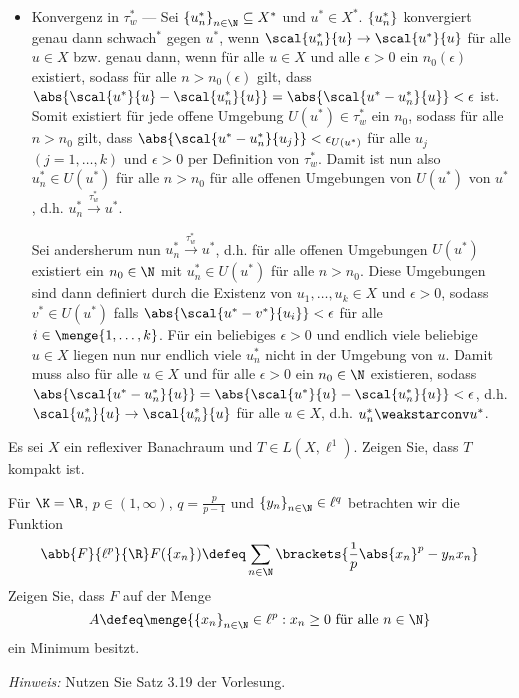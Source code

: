 \begin{exercisePage}
\begin{enumerate}[label=(zu \alph*), leftmargin=*]
\begin{itemize}
			\item Konvergenz in $\tau_w^\ast$ --- Sei $\folge{u_n^\ast}{n \in \N} \subseteq X^\ast$ und $u^\ast \in X^\ast$. $\left\{ u_n^\ast \right\}_{}$ konvergiert genau dann schwach${}^\ast$ gegen $u^\ast$, wenn $\scal{u_n^\ast}{u} \to \scal{u^\ast}{u}$ für alle $u \in X$ bzw. genau dann, wenn für alle $u \in X$ und alle $\epsilon > 0$ ein $n_0(\epsilon)$ existiert, sodass für alle $n > n_0(\epsilon)$ gilt, dass $\abs{\scal{u^\ast}{u} - \scal{u_n^\ast}{u}} = \abs{\scal{u^\ast - u_n^\ast}{u}} < \epsilon$ ist. Somit existiert für jede offene Umgebung $U(u^\ast) \in \tau_w^\ast$ ein $n_0$, sodass für alle $n > n_0$ gilt, dass $\abs{\scal{u^\ast - u_n^\ast}{u_j}} <\epsilon_{U(u^\ast)}$ für alle $u_j$ $(j=1, \dots, k)$ und $\epsilon > 0$ per Definition von $\tau_w^\ast$.
			Damit ist nun also $u_n^\ast \in U(u^\ast)$ für alle $n > n_0$ für alle offenen Umgebungen von $U(u^\ast)$ von $u^\ast$, d.h. $u_n^\ast \overset{\tau_w^\ast}{\to} u^\ast$.
			
			Sei andersherum nun $u_n^\ast \overset{\tau_w^\ast}{\to} u^\ast$, d.h. für alle offenen Umgebungen $U(u^\ast)$ existiert ein $n_0 \in \N$ mit $u_n^\ast \in U(u^\ast)$ für alle $n>n_0$. Diese Umgebungen sind dann definiert durch die Existenz von $u_1, \dots, u_k \in X$ und $\epsilon > 0$, sodass $v^\ast \in U(u^\ast)$ falls $\abs{\scal{u^\ast - v^\ast}{u_i}} < \epsilon$ für alle $i \in \menge{1,  \dots, k}$. Für ein beliebiges $\epsilon>0$ und endlich viele beliebige $u \in X$ liegen nun nur endlich viele $u_n^\ast$ nicht in der Umgebung von $u$. Damit muss also für alle $u \in X$ und für alle $\epsilon >0$ ein $n_0 \in \N$ existieren, sodass $\abs{\scal{u^\ast - u_n^\ast}{u}} = \abs{\scal{u^\ast}{u} - \scal{u_n^\ast}{u}}	< \epsilon$, d.h. $\scal{u_n^\ast}{u} \to \scal{u_n^\ast}{u}$ für alle $u \in X$, d.h. $u_n^\ast \weakstarconv u^\ast$.
		\end{itemize}
	\end{enumerate}

	\begin{exercise}
		Es sei $X$ ein reflexiver Banachraum und $T \in L(X,\ell^1)$. Zeigen Sie, dass $T$ kompakt ist.
	\end{exercise}

	\begin{exercise}
		Für $\K = \R$, $p \in (1, \infty)$, $q = \frac{p}{p-1}$ und $\folge{y_n}{n \in \N} \in \ell^q$ betrachten wir die Funktion
		\begin{equation*}
			\abb{F}{\ell^p}{\R} \mit F(\folge{x_n}{}) \defeq \sum_{n \in \N} \brackets{\frac{1}{p} \abs{x_n}^p - y_n x_n}
		\end{equation*}
		Zeigen Sie, dass $F$ auf der Menge 
		\begin{equation*}
			A \defeq \menge{\folge{x_n}{n \in \N} \in \ell^p: x_n \ge 0 \text{ für alle } n \in \N}
		\end{equation*}
		ein Minimum besitzt.
		
		\textit{Hinweis:} Nutzen Sie Satz 3.19 der Vorlesung.
	\end{exercise}

\end{exercisePage}